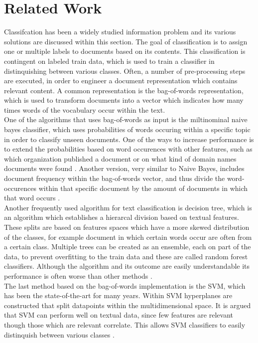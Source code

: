 \section{Related Work}
\label{sec:rel}
Classifcation has been a widely studied information problem and its various solutions are discussed within this section. The goal of classification is to assign one or multiple labels to documents based on its contents. This classification is contingent on labeled train data, which is used to train a classifier in distinquishing between various classes. Often, a number of pre-processing steps are executed, in order to engineer a document representation which contains relevant content. A common representation is the bag-of-words representation, which is used to transform documents into a vector which indicates how many times words of the vocabulary occur within the text.\\
One of the algorithms that uses bag-of-words as input is the miltinominal naive bayes classifier, which uses probabilities of words occuring within a specific topic in order to classify unseen documents. One of the ways to increase performance is to extend the probabilities based on word occurences with other features, such as which organization published a document or on what kind of domain names documents were found \cite{sahami1998bayesian}. Another version, very similar to Naive Bayes, includes document frequency within the bag-of-words vector, and thus divide the word-occurences within that specific document by the amount of documents in which that word occurs \cite{joachims1996probabilistic}. \\
Another frequently used algorithm for text classification is decision tree, which is an algorithm which establishes a hierarcal division based on textual features. These splits are based on features spaces which have a more skewed distribution of the classes, for example document in which certain words occur are often from a certain class. Multiple trees can be created as an ensemble, each on part of the data, to prevent overfitting to the train data and these are called random forest classifiers. Although the algorithm and its outcome are easily understandable its performance is often worse than other methods \cite{li1998classification}.\\
The last method based on the bag-of-words implementation is the SVM, which has been the state-of-the-art for many years. Within SVM hyperplanes are constructed that split datapoints within the multidimensional space. It is argued that SVM can perform well on textual data, since few features are relevant though those which are relevant correlate. This allows SVM classifiers to easily distinquish between various classes \cite{joachims2001statistical}.\\
